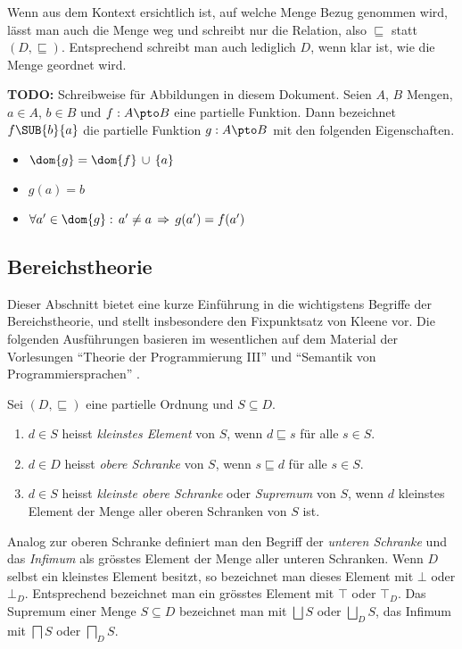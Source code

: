 Wenn aus dem Kontext ersichtlich ist, auf welche Menge Bezug genommen wird, l\"asst man auch die Menge
weg und schreibt nur die Relation, also $\sqsubseteq$ statt $(D,\sqsubseteq)$. Entsprechend schreibt
man auch lediglich $D$, wenn klar ist, wie die Menge geordnet wird.


\begin{definition}
{\bf TODO:} Schreibweise f\"ur Abbildungen in diesem Dokument.
  Seien $A$, $B$ Mengen, $a \in A$, $b \in B$ und $f: A \pto B$ eine partielle Funktion. Dann
  bezeichnet $f\SUB{b}{a}$ die partielle Funktion $g: A \pto B$ mit den folgenden Eigenschaften.
  \begin{itemize}
    \item $\dom{g} = \dom{f}\,\cup\,\{a\}$
    \item $g(a) = b$
    \item $\forall a'\in\dom{g}:\,a' \ne a\,\Rightarrow\,g(a') = f(a')$
  \end{itemize}
\end{definition}



\subsection{Bereichstheorie}
\label{abschnitt:Bereichstheorie}

Dieser Abschnitt bietet eine kurze Einf\"uhrung in die wichtigstens Begriffe der Bereichstheorie, und stellt
insbesondere den Fixpunktsatz von Kleene vor. Die folgenden Ausf\"uhrungen basieren im wesentlichen auf dem
Material der Vorlesungen "`Theorie der Programmierung III"' \cite{Sieber07} und "`Semantik von Programmiersprachen"'
\cite[S.85ff]{Kindler05}.

\begin{definition} \label{definition:math:Schranken}
  Sei $(D,\sqsubseteq)$ eine partielle Ordnung und $S \subseteq D$.
  \begin{enumerate}
    \item $d\in{S}$ heisst {\em kleinstes Element} von $S$, wenn $d\sqsubseteq{s}$ f\"ur alle $s\in{S}$.
    \item $d\in{D}$ heisst {\em obere Schranke} von $S$, wenn $s\sqsubseteq{d}$ f\"ur alle $s\in{S}$.
    \item $d\in{S}$ heisst {\em kleinste obere Schranke} oder {\em Supremum} von $S$, wenn $d$ kleinstes
          Element der Menge aller oberen Schranken von $S$ ist.
  \end{enumerate}
\end{definition}
%
Analog zur oberen Schranke definiert man den Begriff der {\em unteren Schranke} und das
{\em Infimum} als gr\"osstes Element der Menge aller unteren Schranken. Wenn $D$ selbst ein kleinstes
Element besitzt, so bezeichnet man dieses Element mit $\bot$ oder $\bot_D$. Entsprechend bezeichnet
man ein gr\"osstes Element mit $\top$ oder $\top_D$. Das Supremum einer Menge $S \subseteq D$ bezeichnet
man mit $\bigsqcup S$ oder $\bigsqcup_D S$, das Infimum mit $\bigsqcap S$ oder $\bigsqcap_D S$.

